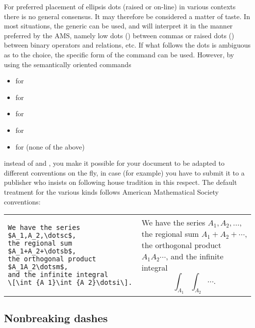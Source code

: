 For preferred placement of ellipsis dots (raised or on-line) in various
contexts there is no general consensus. It may therefore be considered a
matter of taste.  In most situations, the generic  can be used,
and  will interpret it in the manner preferred by the AMS,
namely low dots () between commas or raised dots ()
between binary operators and relations, etc.  If what follows the dots is
ambiguous as to the choice, the specific form of the command can be used.
However, by using the semantically oriented commands
\begin{itemize}
\setlength{\itemsep}{0pt}
\item {} for 
\item {} for 
\item {} for 
\item {} for 
\item {} for  (none of the above)
\end{itemize}
instead of  and , you make it possible for your
document to be adapted to different conventions on the fly, in case (for
example) you have to submit it to a publisher who insists on following
house tradition in this respect. The default treatment for the various
kinds follows American Mathematical Society conventions:
\begin{center}
\vspace{-\topsep}
\begin{tabular}{@{}ll@{}}
\begin{minipage}[t]{.50\textwidth}
\small
\begin{verbatim}
We have the series $A_1,A_2,\dotsc$,
the regional sum $A_1+A_2+\dotsb$,
the orthogonal product $A_1A_2\dotsm$,
and the infinite integral
\[\int_{A_1}\int_{A_2}\dotsi\].
\end{verbatim}
\end{minipage}
&
\begin{minipage}[t]{.48\textwidth}
\noindent
We have the series $A_1,A_2,\dotsc$,
the regional sum $A_1+A_2+\dotsb$,
the orthogonal product $A_1A_2\dotsm$,
and the infinite integral
\[\int_{A_1}\int_{A_2}\dotsi.\]
\end{minipage}
\end{tabular}
\end{center}

\subsection{Nonbreaking dashes}

